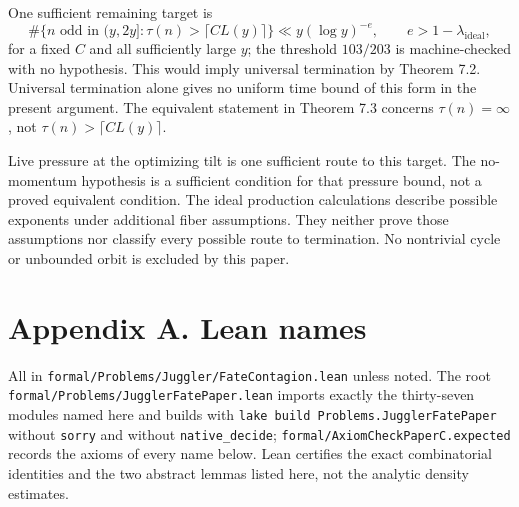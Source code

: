 \documentclass[11pt,a4paper]{article}
\begin{document}
One sufficient remaining target is \[
\#\{n\text{ odd in }(y,2y]:\tau(n)>\lceil CL(y)\rceil\}
 \ll y(\log y)^{-e},\qquad e>1-\lambda_{\mathrm{ideal}},
\] for a fixed \(C\) and all sufficiently large \(y\); the threshold
\(103/203\) is machine-checked with no hypothesis. This would imply
universal termination by Theorem 7.2. Universal termination alone gives
no uniform time bound of this form in the present argument. The
equivalent statement in Theorem 7.3 concerns \(\tau(n)=\infty\), not
\(\tau(n)>\lceil CL(y)\rceil\).

Live pressure at the optimizing tilt is one sufficient route to this
target. The no-momentum hypothesis is a sufficient condition for that
pressure bound, not a proved equivalent condition. The ideal production
calculations describe possible exponents under additional fiber
assumptions. They neither prove those assumptions nor classify every
possible route to termination. No nontrivial cycle or unbounded orbit is
excluded by this paper.

\section{Appendix A. Lean names}\label{appendix-a.-lean-names}

All in \texttt{\nolinkurl{formal/Problems/Juggler/FateContagion.lean}}
unless noted. The root
\texttt{\nolinkurl{formal/Problems/JugglerFatePaper.lean}} imports
exactly the thirty-seven modules named here and builds with
\texttt{lake\ build\ Problems.JugglerFatePaper} without
\texttt{\nolinkurl{sorry}} and without
\texttt{\nolinkurl{native_decide}};
\texttt{\nolinkurl{formal/AxiomCheckPaperC.expected}} records the axioms
of every name below. Lean certifies the exact combinatorial identities
and the two abstract lemmas listed here, not the analytic density
estimates.

\begingroup\small
\end{document}

